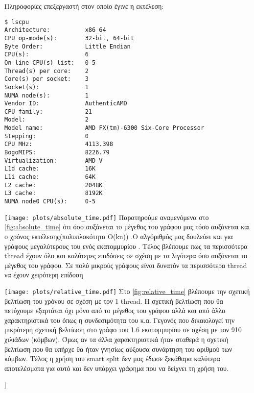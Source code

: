 Πληροφορίες επεξεργαστή στον οποίο έγινε η εκτέλεση:
\begin{lstlisting}[style=Bash]
$ lscpu
Architecture:          x86_64
CPU op-mode(s):        32-bit, 64-bit
Byte Order:            Little Endian
CPU(s):                6
On-line CPU(s) list:   0-5
Thread(s) per core:    2
Core(s) per socket:    3
Socket(s):             1
NUMA node(s):          1
Vendor ID:             AuthenticAMD
CPU family:            21
Model:                 2
Model name:            AMD FX(tm)-6300 Six-Core Processor
Stepping:              0
CPU MHz:               4113.398
BogoMIPS:              8226.79
Virtualization:        AMD-V
L1d cache:             16K
L1i cache:             64K
L2 cache:              2048K
L3 cache:              8192K
NUMA node0 CPU(s):     0-5
\end{lstlisting}

\noindent
\begin{minipage}{\textwidth}
	\centering
	\texttt{[image: plots/absolute\_time.pdf]}
	\label{fig:absolute_time}
Παρατηρούμε αναμενόμενα στο \hyperref[fig:absolute_time]{\figurename{} \ref{fig:absolute_time}} ότι όσο αυξάνεται το μέγεθος του γράφου μας τόσο αυξάνεται και ο χρόνος εκτέλεσης(πολυπλοκότητα Ο(kn)) .Ο αλγόριθμός μας δουλεύει και για γράφους μεγαλύτερους του ενός εκατομμυρίου .
Τέλος βλέπουμε πως τα περισσότερα thread έχουν όλο και καλύτερες επιδόσεις σε σχέση με τα λιγότερα  όσο αυξάνεται το μέγεθος του γράφου.
Σε πολύ μικρούς γράφους είναι δυνατόν τα περισσότερα thread να έχουν χειρότερη επίδοση
\end{minipage}

\noindent
\begin{minipage}{\textwidth}
	\centering
	\texttt{[image: plots/relative\_time.pdf]}
	\label{fig:relative_time}
	Στο  \hyperref[fig:relative_time]{\figurename{} \ref{fig:relative_time}} βλέπουμε την σχετική βελτίωση του χρόνου
σε σχέση με τον 1 thread. Η σχετική βελτίωση που θα πετύχουμε εξαρτάται όχι μόνο από το μέγεθος του γράφου αλλά και από άλλα χαρακτηριστικά του όπως η συνδεσιμότητα του κ.α. Γεγονός που δικαιολογεί την μικρότερη σχετική βελτίωση στο γράφο του 1.6 εκατομμυρίου σε σχέση με τον 910 χιλιάδων (κόμβων). Όμως αν τα άλλα χαρακτηριστικά ήταν σταθερά η σχετική βελτίωση που θα υπήρχε
θα ήταν γνησίως αύξουσα συνάρτηση του αριθμού των κόμβων. Τέλος η χρήση του smart split δεν μας έδωσε ξεκάθαρα καλύτερα αποτελέσματα για αυτό και δεν υπάρχει γράφημα που να δείχνει τη χρήση του.
\end{minipage}]

